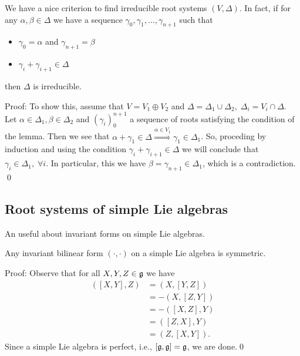 \begin{dang}
    \begin{lemma}\label{Lemma: criteria to irreducible root systems}
        We have a nice criterion to find irreducible root systems $(V,\Delta)$. In fact, if for any 
        $\alpha,\beta\in\Delta$ we have a sequence $\gamma_0,\gamma_1,\dots,\gamma_{n+1}$ such that 
        \begin{itemize}
            \item $\gamma_0=\alpha$ and $\gamma_{n+1}=\beta$
            \item $\gamma_i+\gamma_{i+1}\in\Delta$
        \end{itemize}
        then $\Delta$ is irreducible.
    \end{lemma}
\end{dang}
Proof: To show this, assume that $V=V_1\oplus V_2$ and $\Delta=\Delta_1\cup\Delta_2,\;\Delta_i=V_i\cap \Delta$.
Let $\alpha\in\Delta_1, \beta\in\Delta_2$ and $(\gamma_i)_0^{n+1}$ a sequence of roots satisfying the condition of 
the lemma. Then we see that $\alpha+\gamma_1\in\Delta\overset{\alpha\in V_1}{\Rightarrow}\gamma_1\in \Delta_1$. 
So, proceding by induction and using the condition $\gamma_i+\gamma_{i+1}\in\Delta$ we will conclude that 
$\gamma_i\in\Delta_1,\;\forall i$. In particular, this we have $\beta=\gamma_{n+1}\in\Delta_1$, which is a contradiction.
\qed

\subsection{Root systems of simple Lie algebras}
An useful about invariant forms on simple Lie algebras.
\begin{dang}
    \begin{lemma}
        Any invariant bilinear form $(\cdot,\cdot)$ on a simple Lie algebra is symmetric.
    \end{lemma}
\end{dang}
Proof: Observe that for all $X,Y,Z\in\mathfrak{g}$ we have 
\begin{equation}
    \begin{split}
        ([X,Y],Z)&=(X,[Y,Z])\\
        &=-(X,[Z,Y])\\
        &=-([X,Z],Y)\\
        &=([Z,X],Y)\\
        &=(Z,[X,Y]).
    \end{split}
\end{equation}
Since a simple Lie algebra is perfect, i.e., $[\mathfrak{g},\mathfrak{g}]=\mathfrak{g}$, we are done.\qed



